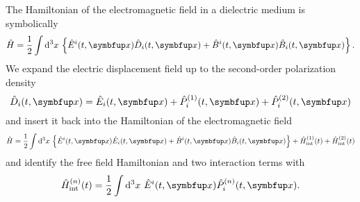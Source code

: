The Hamiltonian of the electromagnetic field in a dielectric medium is symbolically~\cite[p.~124]{Jackson2007}
\begin{equation}
	\hat{H}
	=
	\frac{1}{2}
	\int\dd[3]{x}
	\left\{
		\hat{E}^i(t,\vb{x})
		\hat{D}_i(t,\vb{x})
		+
		\hat{B}^i(t,\vb{x})
		\hat{B}_i(t,\vb{x})
	\right\}
	.
\end{equation}
We expand the electric displacement field up to the second-order polarization density
\begin{equation}
	\hat{D}_i(t,\vb{x})
	=
	\hat{E}_i(t,\vb{x})
	+
	\hat{P}_i^{(1)}(t,\vb{x})
	+
	\hat{P}_i^{(2)}(t,\vb{x})
\end{equation}
and insert it back into the Hamiltonian of the electromagnetic field
\begin{equation}
	\hat{H}
	=
	\frac{1}{2}
	\int\dd[3]{x}
	\left\{
		\hat{E}^i(t,\vb{x})
		\hat{E}_i(t,\vb{x})
		+
		\hat{B}^i(t,\vb{x})
		\hat{B}_i(t,\vb{x})
	\right\}
	+
	\hat{H}_\text{int}^{(1)}(t)
	+
	\hat{H}_\text{int}^{(2)}(t)
\end{equation}
and identify the free field Hamiltonian and two interaction terms with
\begin{align}
	\hat{H}_\text{int}^{(n)}(t)
	=	
	\frac{1}{2}
	\int\dd[3]{x}
	\hat{E}^i(t,\vb{x})
	\hat{P}_i^{(n)}(t,\vb{x})
	.
\end{align}


